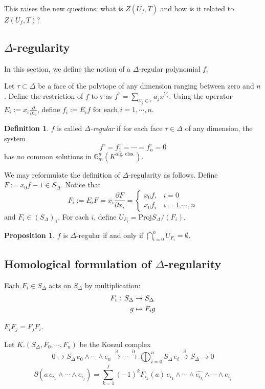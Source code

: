 \documentclass[a4paper,oneside,11pt]{article}
\theoremstyle{plain} \theoremstyle{definition}
\newtheorem{Prop}[Thm]{Proposition}
\newtheorem{Defn}[Thm]{Definition}
\theoremstyle{remark}
\begin{document}
This raises the new questions: what is $Z(\overline{U_f}, T)$ and
how is it related to $Z(U_f, T)$?

\subsection{$\Delta$-regularity}
In this section, we define the notion of a $\Delta$-regular
polynomial $f$. 

Let $\tau \subset \Delta$ be a face of the polytope of any
dimension ranging between zero and $n$. Define the restriction of
$f$ to $\tau$ as $f^\tau = \sum_{V_j\in \tau} a_j x^{V_j}$. Using
the operator $E_i := x_i \frac{\partial}{\partial x_i}$, define
$f_i := E_i f$ for each $i=1, \cdots, n$.

\begin{Defn}
$f$ is called \emph{$\Delta$-regular} if for each face $\tau \in
\Delta$ of any dimension, the system
\[
f^\tau = f_1^\tau = \cdots = f_n^\tau = 0
\]
has no common solutions in $\mathbb{G}_m^n(K^{\text{alg.
clos.}})$.
\end{Defn}

We may reformulate the definition of $\Delta$-regularity as follows.
Define $F := x_0 f - 1 \in S_\Delta$. Notice that
\[
F_i := E_i F = x_i \frac{\partial F}{\partial x_i} =
\begin{cases}
x_0f, & i=0\\
x_0f_i & i=1,\cdots,n
\end{cases}
\]
and $F_i \in (S_\Delta)_1$. For each $i$, define $U_{F_i}=
\text{Proj} S_\Delta /(F_i)$.

\begin{Prop}
$f$ is $\Delta$-regular if and only if $\bigcap_{i=0}^n
U_{F_i}=\emptyset.$
\end{Prop}

\subsection{Homological formulation of $\Delta$-regularity}
\vskip 3mm Each $F_i\in S_\Delta$ acts on $S_\Delta$ by
multiplication:
$$\aligned F_i:\, S_\Delta&\rightarrow S_\Delta\\ g&\mapsto
F_ig\endaligned$$

$F_iF_j=F_jF_i$.

Let $K.(S_\Delta, F_0,\cdots, F_n)$ be the Koszul complex
$$0\longrightarrow S_\Delta\, e_0\wedge\cdots\wedge e_n {\stackrel{\partial}
  {\longrightarrow}}\cdots {\stackrel{\partial}
{\longrightarrow}}\bigoplus_{i=0}^nS_\Delta\, e_i{\stackrel{\partial}
{\longrightarrow}}S_\Delta\longrightarrow 0 $$
$$\partial (a\,e_{i_1}\wedge \cdots \wedge e_{i_j})=\sum_{k=1}^j (-1)^k
F_{i_k}(a)\,e_{i_1}\wedge \cdots \wedge
\widehat{e_{i_k}}\wedge\cdots \wedge e_{i_j}$$
\end{document}
